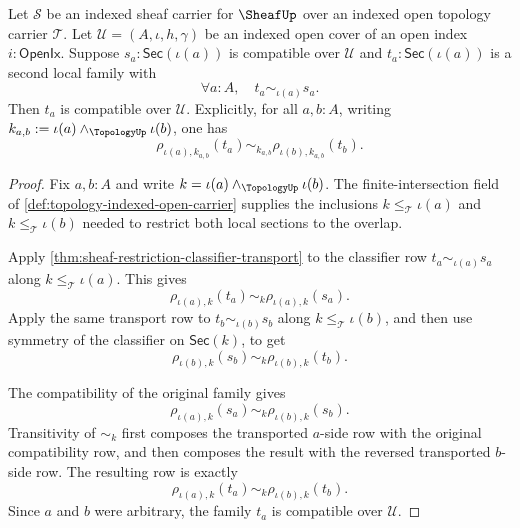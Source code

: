 \begin{theorem}
\label{thm:sheaf-gluing-compatible-family-stability}
Let $\mathcal{S}$ be an indexed sheaf carrier for $\SheafUp$ over an indexed open topology carrier $\mathcal{T}$. Let $\mathcal{U}=(A,\iota,h,\gamma)$ be an indexed open cover of an open index $i:\mathsf{OpenIx}$. Suppose $s_a:\mathsf{Sec}(\iota(a))$ is compatible over $\mathcal{U}$ and $t_a:\mathsf{Sec}(\iota(a))$ is a second local family with
$$
\forall a:A,\quad t_a\sim_{\iota(a)}s_a.
$$
Then $t_a$ is compatible over $\mathcal{U}$. Explicitly, for all $a,b:A$, writing $k_{a,b}:=\iota(a)\wedge_{\TopologyUp}\iota(b)$, one has
$$
\rho_{\iota(a),k_{a,b}}(t_a)
\sim_{k_{a,b}}
\rho_{\iota(b),k_{a,b}}(t_b).
$$
\end{theorem}
\begin{proof}
Fix $a,b:A$ and write $k=\iota(a)\wedge_{\TopologyUp}\iota(b)$. The finite-intersection field of \autoref{def:topology-indexed-open-carrier} supplies the inclusions $k\le_{\mathcal{T}}\iota(a)$ and $k\le_{\mathcal{T}}\iota(b)$ needed to restrict both local sections to the overlap.

Apply \autoref{thm:sheaf-restriction-classifier-transport} to the classifier row $t_a\sim_{\iota(a)}s_a$ along $k\le_{\mathcal{T}}\iota(a)$. This gives
$$
\rho_{\iota(a),k}(t_a)
\sim_k
\rho_{\iota(a),k}(s_a).
$$
Apply the same transport row to $t_b\sim_{\iota(b)}s_b$ along $k\le_{\mathcal{T}}\iota(b)$, and then use symmetry of the classifier on $\mathsf{Sec}(k)$, to get
$$
\rho_{\iota(b),k}(s_b)
\sim_k
\rho_{\iota(b),k}(t_b).
$$

The compatibility of the original family gives
$$
\rho_{\iota(a),k}(s_a)
\sim_k
\rho_{\iota(b),k}(s_b).
$$
Transitivity of $\sim_k$ first composes the transported $a$-side row with the original compatibility row, and then composes the result with the reversed transported $b$-side row. The resulting row is exactly
$$
\rho_{\iota(a),k}(t_a)
\sim_k
\rho_{\iota(b),k}(t_b).
$$
Since $a$ and $b$ were arbitrary, the family $t_a$ is compatible over $\mathcal{U}$.
\end{proof}
